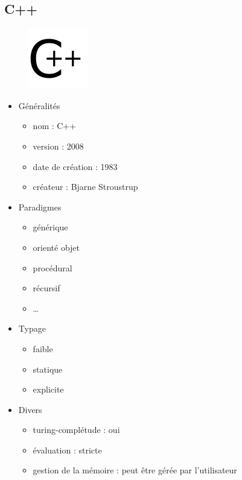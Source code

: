 \newpage

\subsection{C++}

\begin{figure}[!ht]
	\center
	\includegraphics[scale=0.7]{img/cxx}
\end{figure}

\renewcommand{\labelitemi}{\textbullet}
\begin{itemize}
\item Généralités
	\begin{itemize}
	\item nom : C++
	\item version : 2008
	\item date de création : 1983
	\item créateur : Bjarne Stroustrup\\
	\end{itemize}
\item Paradigmes
	\begin{itemize}
	\item générique
	\item orienté objet
	\item procédural
	\item récursif
	\item …\\
	\end{itemize}
\item Typage
	\begin{itemize}
	\item faible
	\item statique
	\item explicite\\
	\end{itemize}
\item Divers
	\begin{itemize}
	\item turing-complétude : oui
	\item évaluation : stricte
	\item gestion de la mémoire : peut être gérée par l'utilisateur\\

\end{itemize}
\end{itemize}
